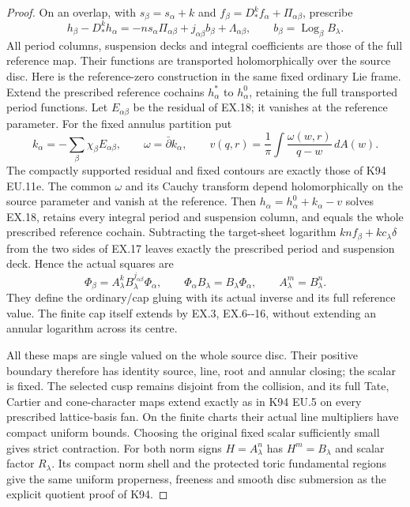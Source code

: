 \begin{proof}
On an overlap, with \(s_\beta=s_\alpha+k\) and
\(f_\beta=D_*^k f_\alpha+\Pi_{\alpha\beta}\), prescribe
\[
 h_\beta-D_*^k h_\alpha
   =-n s_\alpha\Pi_{\alpha\beta}
       +j_{\alpha\beta}b_\beta+\Lambda_{\alpha\beta},
 \qquad b_\beta=\operatorname{Log}_\beta B_\lambda.
 \tag{EX.18}
\]
All period columns, suspension decks and integral coefficients
are those of the full reference map. Their functions are
transported holomorphically over the source disc. Here is the reference-zero construction in the same fixed
ordinary Lie frame. Extend the prescribed reference cochains
\(h_\alpha^*\) to \(h_\alpha^0\), retaining the full
transported period functions. Let \(E_{\alpha\beta}\) be
the residual of EX.18; it vanishes at the reference parameter.
For the fixed annulus partition put
\[
 k_\alpha=-\sum_\beta\chi_\beta E_{\alpha\beta},
 \qquad \omega=\bar\partial k_\alpha,
 \qquad v(q,r)=\frac1\pi\int
                \frac{\omega(w,r)}{q-w}\,dA(w).
\]
The compactly supported residual and fixed contours are exactly
those of K94 EU.11e. The common \(\omega\) and its Cauchy
transform depend holomorphically on the source parameter and
vanish at the reference. Then
\(h_\alpha=h_\alpha^0+k_\alpha-v\) solves EX.18,
retains every integral period and suspension column, and equals
the whole prescribed reference cochain. Subtracting the target-sheet logarithm
\(kn f_\beta+kc_\lambda\delta\) from the two sides of
EX.17 leaves exactly the prescribed period and suspension deck.
Hence the actual squares are
\[
 \Phi_\beta=A_\lambda^k B_\lambda^{j_{\alpha\beta}}
                  \Phi_\alpha,\qquad
 \Phi_\alpha B_\lambda=B_\lambda\Phi_\alpha,
 \qquad A_\lambda^m=B_\lambda^n.
 \tag{EX.19}
\]
They define the ordinary/cap gluing with its actual inverse
and its full reference value. The finite cap itself extends
by EX.3, EX.6-\/-16, without extending an annular logarithm
across its centre.

All these maps are single valued on the whole source disc.
Their positive boundary therefore has identity source, line,
root and annular closing; the scalar is fixed. The selected
cusp remains disjoint from the collision, and its full Tate,
Cartier and cone-character maps extend exactly as in K94 EU.5
on every prescribed lattice-basis fan. On the finite charts
their actual line multipliers have compact uniform bounds.
Choosing the original fixed scalar sufficiently small gives
strict contraction. For both norm signs \(H=A_\lambda^n\)
has \(H^m=B_\lambda\) and scalar factor \(R_\lambda\).
Its compact norm shell and the protected toric fundamental
regions give the same uniform properness, freeness and smooth
disc submersion as the explicit quotient proof of K94.


\end{proof}
